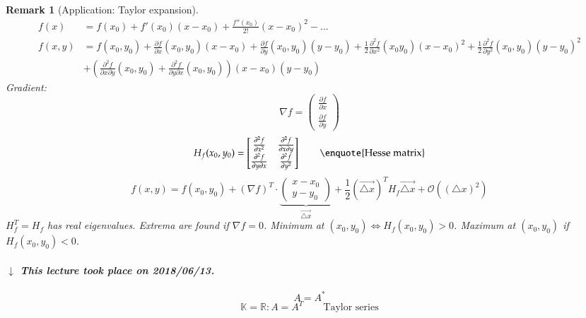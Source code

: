 \documentclass{article}
\newtheorem{remark}{Remark}  \numberwithin{remark}{section}
\newcommand{\dateref}[1]{%
  \begin{mdframed}[backgroundcolor=gray!10,innerbottommargin=0pt,innertopmargin=0pt]
    \paragraph{\textit{$\downarrow$ This lecture took place on #1.}}%
  \end{mdframed}%
}
\begin{document}
\begin{remark}[Application: Taylor expansion]
  \begin{align*}
    f(x) &= f(x_0) + f'(x_0)(x - x_0) + \frac{f''(x_0)}{2!} (x - x_0)^2 - \dots \\
    f(x,y) &= f(x_0, y_0) + \frac{\partial f}{\partial x} (x_0, y_0)(x - x_0) + \frac{\partial f}{\partial y} (x_0, y_0)(y - y_0) + \frac12 \frac{\partial^2 f}{\partial x^2} (x_0 y_0)(x - x_0)^2 + \frac12 \frac{\partial^2 f}{\partial y^2} (x_0, y_0) (y - y_0)^2 \\
      &+ \left(\frac{\partial^2 f}{\partial x \partial y} (x_0, y_0) + \frac{\partial^2 f}{\partial y \partial x} (x_0, y_0)\right) (x - x_0) (y - y_0)
  \end{align*}
  Gradient:
  \[ \nabla f = \begin{pmatrix} \frac{\partial f}{\partial x} \\ \frac{\partial f}{\partial y} \end{pmatrix} \]
  \[ H_f(x_0, y_0) = \begin{bmatrix}
      \frac{\partial^2 f}{\partial x^2} & \frac{\partial^2 f}{\partial x \partial y} \\
      \frac{\partial^2 f}{\partial y \partial x} & \frac{\partial^2 f}{\partial y^2}
    \end{bmatrix} \qquad \text{\enquote{Hesse matrix}}
  \] \[
    f(x, y) = f(x_0, y_0) + (\nabla f)^T \cdot \underbrace{\begin{pmatrix} x - x_0 \\ y - y_0 \end{pmatrix}}_{\vec{\triangle x}}
    + \frac12 (\vec{\triangle x})^T H_f \vec{\triangle x} + \mathcal O((\triangle x)^2)
  \]
  $H_f^T = H_f$ has real eigenvalues. Extrema are found if $\nabla f = 0$.
  Minimum at $(x_0, y_0) \iff H_f(x_0, y_0) > 0$. Maximum at $(x_0, y_0)$ if $H_f(x_0, y_0) < 0$.
\end{remark}

\dateref{2018/06/13}

\[ A = A^* \]
\[ \mathbb K = \mathbb R: A = A^T \qquad \text{Taylor series} \]
\end{document}
